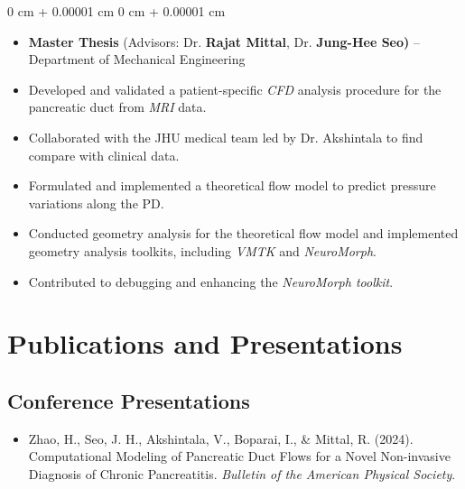 \documentclass[10pt, letterpaper]{article}
\newenvironment{highlights}{
    \begin{itemize}[
        topsep=0.10 cm,
        parsep=0.10 cm,
        partopsep=0pt,
        itemsep=0pt,
        leftmargin=0 cm + 10pt
    ]
}{
    \end{itemize}
} %
\newenvironment{onecolentry}{
    \begin{adjustwidth}{
        0 cm + 0.00001 cm
    }{
        0 cm + 0.00001 cm
    }
}{
    \end{adjustwidth}
} %
\begin{document}
    \vspace{0.10 cm}
    \begin{onecolentry}
        \begin{highlights}
            \item \textbf{Master Thesis} (Advisors: Dr. \textbf{Rajat Mittal}, Dr. \textbf{Jung-Hee Seo)} – Department of Mechanical Engineering
            \item Developed and validated a patient-specific \textit{CFD} analysis procedure for the pancreatic duct from \textit{MRI} data.
            \item Collaborated with the JHU medical team led by Dr. Akshintala to find compare with clinical data.
            \item Formulated and implemented a theoretical flow model to predict pressure variations along the PD.
            \item Conducted geometry analysis for the theoretical flow model and implemented geometry analysis toolkits, including \textit{VMTK} and \textit{NeuroMorph}.
            \item Contributed to debugging and enhancing the \textit{NeuroMorph toolkit}.
        \end{highlights}
    \end{onecolentry}
    
    
    
    
    
    
    
    
    

    \vspace{0.2 cm}

    \section{Publications and Presentations}


    \subsection*{Conference Presentations}
    \begin{itemize}[leftmargin=*, itemsep=0pt]
        \item Zhao, H., Seo, J. H., Akshintala, V., Boparai, I., \& Mittal, R. (2024). Computational Modeling of Pancreatic Duct Flows for a Novel Non-invasive Diagnosis of Chronic Pancreatitis. \textit{Bulletin of the American Physical Society}.
    \end{itemize}
\end{document}
